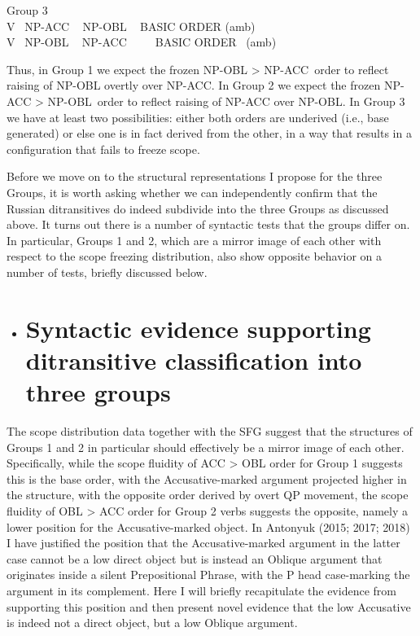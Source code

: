 \documentclass[output=paper,modfonts, nonflat]{langsci/langscibook}
\begin{document}
          Group 3\\
V ~NP-ACC ~ NP-OBL ~     BASIC ORDER (amb)\\
V ~NP-OBL ~ NP-ACC ~~ ~     BASIC ORDER ~(amb)

Thus, in Group 1 we expect the frozen NP-OBL > NP-ACC~order to reflect raising of NP-OBL overtly over NP-ACC. In Group 2 we expect the frozen NP-ACC > NP-OBL~order to reflect raising of NP-ACC over NP-OBL.  In Group 3 we have at least two possibilities: either both orders are underived (i.e., base generated) or else one is in fact derived from the other, in a way that results in a configuration that fails to freeze scope.

Before we move on to the structural representations I propose for the three Groups, it is worth asking whether we can independently confirm that the Russian ditransitives do indeed subdivide into the three Groups as discussed above. It turns out there is a number of syntactic tests that the groups differ on. In particular, Groups 1 and 2, which are a mirror image of each other with respect to the scope freezing distribution, also show opposite behavior on a number of tests, briefly discussed below. 

\begin{itemize}
\item \section{Syntactic evidence supporting ditransitive classification into three groups}
\end{itemize}

The scope distribution data together with the SFG suggest that the structures of Groups 1 and 2 in particular should effectively be a mirror image of each other. Specifically, while the scope fluidity of ACC > OBL order for Group 1 suggests this is the base order, with the Accusative-marked argument projected higher in the structure, with the opposite order derived by overt QP movement, the scope fluidity of OBL > ACC order for Group 2 verbs suggests the opposite, namely a lower position for the Accusative-marked object. In Antonyuk (2015; 2017; 2018) I have justified the position that the Accusative-marked argument in the latter case cannot be a low direct object but is instead an Oblique argument that originates inside a silent Prepositional Phrase, with the P head case-marking the argument in its complement. Here I will briefly recapitulate the evidence from \citet{Antonyuk2015} supporting this position and then present novel evidence that the low Accusative is indeed not a direct object, but a low Oblique argument.
\end{document}
